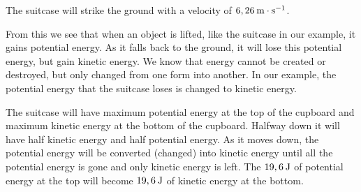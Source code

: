         \label{m38786*id69118}The suitcase will strike the ground with a velocity of $6,26\phantom{\rule{2pt}{0ex}}\mathrm{m}\ensuremath{\cdot}\mathrm{s}{}^{-1}$.\par 
        \label{m38786*id69148}From this we see that when an object is lifted, like the suitcase in our example, it gains potential energy. As it falls back to the ground, it will lose this potential energy, but gain kinetic energy. We know that energy cannot be created or destroyed, but only changed from one form into another. In our example, the potential energy that the suitcase loses is changed to kinetic energy.\par 
        \label{m38786*id69157}The suitcase will have maximum potential energy at the top of the cupboard and maximum kinetic energy at the bottom of the cupboard. Halfway down it will have half kinetic energy and half potential energy. As it moves down, the potential energy will be converted (changed) into kinetic energy until all the potential energy is gone and only kinetic energy is left. The $19,6\phantom{\rule{2pt}{0ex}}\mathrm{J}$ of potential energy at the top will become $19,6\phantom{\rule{2pt}{0ex}}\mathrm{J}$ of kinetic energy at the bottom.\par 
\label{m38786*secfhsst!!!underscore!!!id1898}\vspace{.5cm} 
      \noindent
